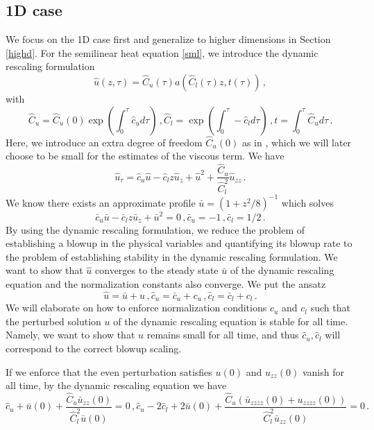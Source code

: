 \documentclass[12pt]{caltech_thesis}
\numberwithin{equation}{section}
\begin{document}
\subsection{1D case}
We focus on the 1D case first and generalize to higher dimensions in Section \ref{highd}.
For the semilinear heat equation \eqref{sml}, we introduce the dynamic rescaling formulation
$$\hat{u}(z,\tau)=\hat{C}_u(\tau) a(\hat{C}_l(\tau)z,t(\tau))\,,$$ with $$\hat{C}_u=\hat{C}_u(0)\exp{(\int_0^\tau \hat{c}_u d\tau)}\,, \hat{C}_l=\exp{(\int_0^\tau -\hat{c}_l d\tau)}\,,t=\int_0^\tau \hat{C}_u d\tau\,.$$
Here, we introduce an extra degree of freedom $\hat{C}_u(0)$ as in \cite{chen2020singularity, hou2024blowup}, which we will later choose to be small for the estimates of the viscous term.
We have $$\hat{u}_\tau=\hat{c}_u \hat{u}-\hat{c}_l z\hat{u}_z+\hat{u}^2+\frac{\hat{C}_u}{\hat{C}_l^2}\hat{u}_{zz}\,.$$
    We know there exists an approximate profile $\bar{u}=(1+z^2/8)^{-1}$ which solves $$ \bar{c}_u\bar{u}-\bar{c}_l z\bar{u}_z+\bar{u}^2=0\,, \bar{c}_u=-1\,,\bar{c}_l=1/2\,.$$
 By using the dynamic rescaling formulation, we reduce the problem of establishing a blowup in the physical variables and quantifying its blowup rate to the problem of establishing stability in the dynamic rescaling formulation. We want to show that $\hat{u}$ converges to the steady state $\bar{u}$ of the dynamic rescaling equation and the normalization constants also converge.
We put the ansatz  $$\hat{u}=\bar{u}+u\,, \hat{c}_u=\bar{c}_u+c_u\,, \hat{c}_l=\bar{c}_l+c_l\,.$$
We will elaborate on how to enforce normalization conditions $c_u$ and $c_l$ such that the perturbed solution $u$ of the dynamic rescaling equation is stable for all time. Namely, we want to show that $u$ remains small for all time, and thus $\hat{c}_u,\hat{c}_l$ will correspond to the correct blowup scaling.



 If we enforce that the even perturbation satisfies $u(0)$ and $u_{zz}(0)$ vanish for all time, by the dynamic rescaling equation we have 
\begin{equation}\label{cons_hat}
    \hat{c}_u+\bar{u}(0)+\frac{\hat{C}_u \bar{u}_{zz}(0)}{\hat{C}_l^2 \bar{u}(0)}=0\,,\hat{c}_u-2\hat{c}_l+2\bar{u}(0)+\frac{\hat{C}_u (\bar{u}_{zzzz}(0)+{u}_{zzzz}(0))}{\hat{C}_l^2 \bar{u}_{zz}(0)}=0\,.
\end{equation}
\end{document}
